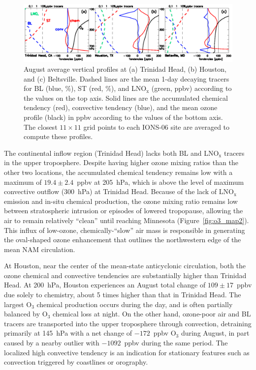  \begin{figure}
 \noindent\includegraphics[width=40pc]{Figures/tendency_v.eps}
 \caption[August average mixing ratio and tracer vertical profiles]{\small
August average vertical profiles at (a) Trinidad Head, (b) Houston, and (c)
Beltsville. Dashed lines are the mean 1-day decaying tracers for BL (blue, \%),
ST (red, \%), and LNO$_{\mathrm{x}}$ (green, ppbv) according to the
values on the top axis. Solid lines are the accumulated chemical
tendency (red), convective tendency (blue), and the mean ozone profile
(black) in ppbv according to the values of the bottom axis. The closest
$11\times11$ grid points to each IONS-06 site are averaged to compute
these profiles.}
 \label{fig:tend_v}
 \end{figure}

The continental inflow region (Trinidad Head) lacks both BL and LNO$_{\mathrm{x}}$
tracers in the upper troposphere. Despite having higher ozone mixing ratios than the
other two locations, the accumulated chemical tendency remains low with a maximum of
$19.4\pm2.4$~ppbv at 205~hPa, which is above the level of maximum
convective outflow (300~hPa) at Trinidad Head. Because of the lack of
LNO$_{\mathrm{x}}$ emission and  in-situ chemical production,
the ozone mixing ratio remains low between stratospheric intrusion or episodes of lowered tropopause, allowing
the air to remain relatively ``clean'' until reaching Minnesota (Figure~\ref{fig:o3_map2}). This influx of low-ozone, 
chemically-``slow'' air mass is responsible in generating the oval-shaped ozone
enhancement that outlines the northwestern edge of the mean NAM circulation.

At Houston, near the center of the mean-state anticyclonic circulation, both the ozone
chemical and convective tendencies are substantially higher than Trinidad Head. At
200~hPa, Houston experiences an August total change of $109\pm17$~ppbv due
solely to chemistry, about 5 times higher than that in Trinidad Head.
The largest O$_3$ chemical production occurs during the day, and is often partially balanced by O$_3$
chemical loss at night.
On the other hand, ozone-poor air and BL tracers are transported into
the upper troposphere through convection, detraining primarily at 145~hPa with a
net change of $-172$~ppbv O$_3$ during August, in part caused by a nearby outlier
with $-1092$~ppbv during the same period. The localized high convective tendency is
an indication for stationary features such as convection triggered by coastlines
or orography.

